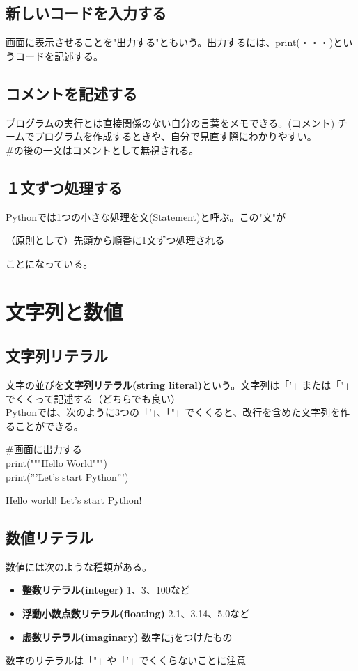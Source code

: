 \documentclass[11pt,a4paper]{jreport}
\begin{document}
\subsection{新しいコードを入力する}
画面に表示させることを"出力する"ともいう。出力するには、print(・・・)というコードを記述する。

\subsection{コメントを記述する}
プログラムの実行とは直接関係のない自分の言葉をメモできる。(コメント) チームでプログラムを作成するときや、自分で見直す際にわかりやすい。\\
\#の後の一文はコメントとして無視される。

\subsection{１文ずつ処理する}
Pythonでは1つの小さな処理を文(Statement)と呼ぶ。この"文"が
\begin{center}
 （原則として）先頭から順番に1文ずつ処理される
\end{center}
ことになっている。

\section{文字列と数値}
\subsection{文字列リテラル}
文字の並びを{\bf 文字列リテラル(string literal)}という。文字列は「'」または「"」でくくって記述する（どちらでも良い）\\
Pythonでは、次のように3つの「'」、「"」でくくると、改行を含めた文字列を作ることができる。

\begin{shadebox}
 \#画面に出力する\\
 print("""Hello
 World""")\\
 print('''Let's
 start
 Python''')
\end{shadebox}
\vspace{0.2in}
\begin{screen}
 Hello
 world!
 Let's
 start
 Python!
\end{screen}
\vspace{0.2in}

\subsection{数値リテラル}
数値には次のような種類がある。
\begin{itemize}

 \item {\bf 整数リテラル(integer)} 1、3、100など
 \item {\bf 浮動小数点数リテラル(floating)} 2.1、3.14、5.0など
 \item {\bf 虚数リテラル(imaginary)} 数字にjをつけたもの

\end{itemize}
数字のリテラルは「"」や「'」でくくらないことに注意
\end{document}
